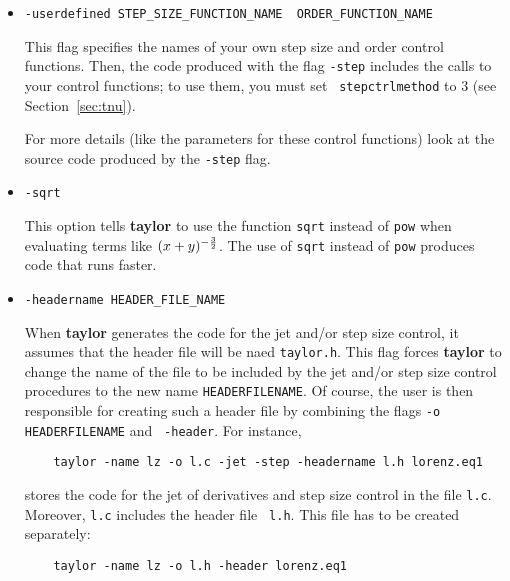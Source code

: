 \documentclass[10pt]{article}
\theoremstyle{remark}
\newcommand{\taylorname}{{\bf taylor}}
\begin{document}
\begin{itemize}
{The generated procedure is also the main call to the numerical
integrator:
\begin{verbatim}
    int taylor_step_ODE_NAME(MY_FLOAT *time,
                             MY_FLOAT *xvars,
                             int      direction,
                             int      step_ctrl_method,
                             double   log10abserr,
                             double   log10relerr,
                             MY_FLOAT *endtime,
                             MY_FLOAT *stepused,
                             int      *order,
                             MY_JET   *jetInOut)
\end{verbatim}
This code needs the header file to be compiled (see the remarks
above). Given an initial condition ({\tt time},{\tt xvars},{\tt
  jetInOut}), this function computes a new point on the corresponding
orbit with the jet variables transported. The meaning of the
parameters is explained in Section~\ref{sec:or}.  }

\item{\verb+-userdefined STEP_SIZE_FUNCTION_NAME  ORDER_FUNCTION_NAME+

This flag specifies the names of your own step size and order control
functions. Then, the code produced with the flag {\tt -step} includes
the calls to your control functions; to use them, you must set {\tt
  stepctrlmethod} to 3 (see
Section~\ref{sec:tnu}).

For more details (like the parameters for these control functions)
look at the source code produced by the {\tt -step} flag.  }

\item{\verb+-sqrt+

This option tells \taylorname{} to use the function \verb+sqrt+
instead of \verb+pow+ when evaluating terms like $(x+y)^{-{3\over
    2}}$.  The use of {\tt sqrt} instead of {\tt pow} produces code
that runs faster.}

\item{\verb+-headername HEADER_FILE_NAME+

When \taylorname{} generates the code for the jet and/or step size
control, it assumes that the header file will be naed {\tt taylor.h}.
This flag forces \taylorname{} to change the name of the file to be
included by the jet and/or step size control procedures to the new
name {\tt HEADERFILENAME}. Of course, the user
is then responsible for creating such a header file by combining the
flags {\tt -o HEADERFILENAME} and {\tt
  -header}. For instance,
\begin{verbatim}
    taylor -name lz -o l.c -jet -step -headername l.h lorenz.eq1
\end{verbatim}
stores the code for the jet of derivatives and step size control in
the file {\tt l.c}. Moreover, {\tt l.c} includes the header file {\tt
  l.h}. This file has to be created separately:
\begin{verbatim}
    taylor -name lz -o l.h -header lorenz.eq1
\end{verbatim}
}


\end{itemize}
\end{document}

